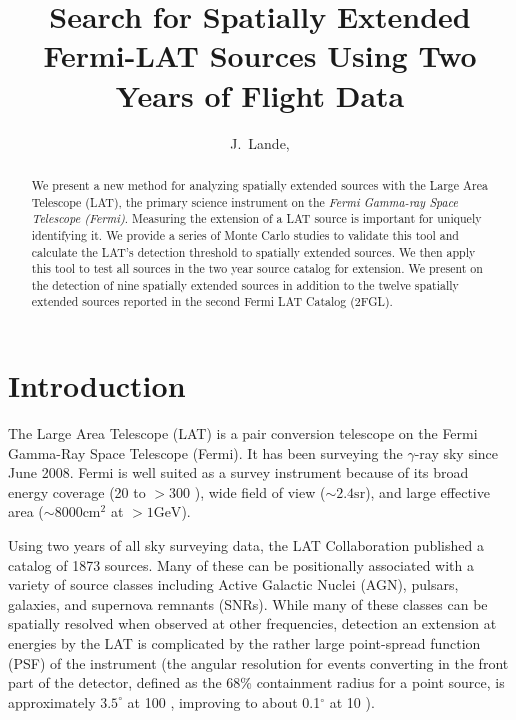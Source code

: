 \documentclass[12pt,preprint]{aastex}
\newcommand{\mev}{\text{MeV}\xspace}
\newcommand{\gev}{\text{GeV}\xspace}
\newcommand{\sr}{\text{sr}\xspace}
\newcommand{\cm}{\text{cm}\xspace}
\renewcommand{\approx}{\sim\!\xspace}
\begin{document}
\title{Search for Spatially Extended Fermi-LAT Sources Using Two Years of Flight
Data}

\author{
J.~Lande, 
}


\begin{abstract}
We present a new method for analyzing spatially extended sources with
the Large Area Telescope (LAT), the primary science instrument on the
{\em Fermi Gamma-ray Space Telescope (Fermi)}. Measuring the extension
of a LAT source is important for uniquely identifying it.  We provide
a series of Monte Carlo studies to validate this tool and calculate
the LAT's detection threshold to spatially extended sources.  We then
apply this tool to test all sources in the two year source catalog for
extension. We present on the detection of nine spatially extended sources
in addition to the twelve spatially extended sources reported in the
second Fermi LAT Catalog (2FGL).
\end{abstract}

\listoftodos

\section{Introduction}

The Large Area Telescope (LAT) is a pair conversion telescope on the
Fermi Gamma-Ray Space Telescope (Fermi). It has been surveying the
$\gamma$-ray sky since June 2008.  Fermi is well suited as a survey
instrument because of its broad energy coverage (20 \mev to $>300$
\gev), wide field of view ($\approx 2.4 \sr$), and large effective area
($\approx 8000 \cm^2$ at $>1 \gev$).

Using two years of all sky surveying data, the LAT Collaboration
published a catalog of 1873 \gev sources\cite{second_cat}. Many of these can
be positionally associated with a variety of source classes including
Active Galactic Nuclei (AGN), pulsars, galaxies, and supernova
remnants (SNRs).  While many of these classes can be spatially
resolved when observed at other frequencies, detection an extension at
\gev energies by the LAT is complicated by the rather large
point-spread function (PSF) of the instrument (the angular resolution
for events converting in the front part of the detector, defined as
the 68\% containment radius for a point source, is approximately
$3.5^{\circ}$ at 100 \mev, improving to about 0.1$^{\circ}$ at 10 \gev).
\end{document}
